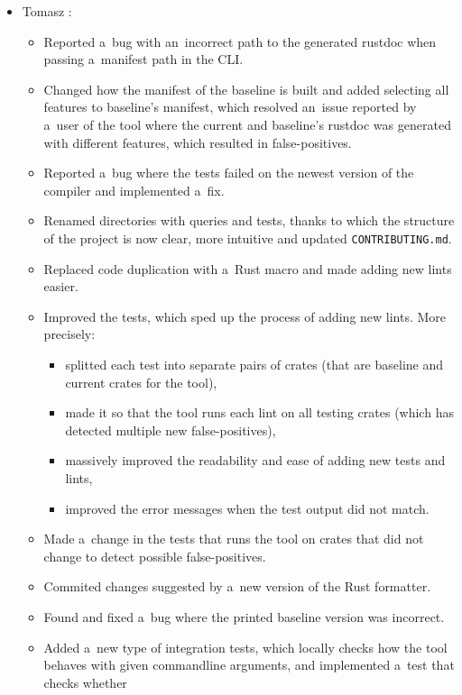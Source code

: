 \documentclass[licencjacka,en]{pracamgr}
\begin{document}
\begin{itemize}
	\item Tomasz \cite{responsibilities-tomasz}:
		\begin{itemize}
			\item Reported a~bug with an~incorrect path to the generated rustdoc when passing
				a~manifest path in the CLI.
			\item Changed how the manifest of the baseline is built and added selecting all
				features to baseline's manifest, which resolved an~issue reported by a~user of
				the tool where the current and baseline's rustdoc was generated with different
				features, which resulted in false-positives.
			\item Reported a~bug where the tests failed on the newest version of the compiler
				and implemented a~fix.
			\item Renamed directories with queries and tests, thanks to which the structure of
				the project is now clear, more intuitive and updated \texttt{CONTRIBUTING.md}.
			\item Replaced code duplication with a~Rust macro and made adding new lints easier.
			\item Improved the tests, which sped up the process of adding new lints.
				More precisely:
				\begin{itemize}
					\item splitted each test into separate pairs of crates (that are baseline
						and current crates for the tool),
					\item made it so that the tool runs each lint on all testing crates
						(which has detected multiple new false-positives),
					\item massively improved the readability and ease of adding new tests and lints,
					\item improved the error messages when the test output did not match.
				\end{itemize}
			\item Made a~change in the tests that runs the tool on crates that did not change
				to detect possible false-positives.
			\item Commited changes suggested by a~new version of the Rust formatter.
			\item Found and fixed a~bug where the printed baseline version was incorrect.
			\item Added a~new type of integration tests, which locally checks how the tool behaves
				with given commandline arguments, and implemented a~test that checks whether

\end{itemize}
\end{itemize}
\end{document}
